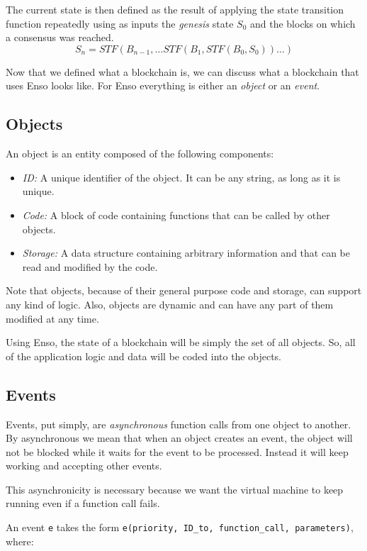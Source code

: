 \documentclass[conference]{IEEEtran}
\begin{document}
The current state is then defined as the result of applying the state transition function repeatedly using as inputs the \textit{genesis} state $ S_0 $ and the blocks on which a consensus was reached.
\[ S_n = STF(B_{n-1}, \ldots STF(B_1,STF(B_0,S_0)) \ldots) \]

Now that we defined what a blockchain is, we can discuss what a blockchain that uses Enso looks like. For Enso everything is either an \textit{object} or an \textit{event}.

\subsection{Objects}
An object is an entity composed of the following components:

\begin{itemize}
	\item \textit{ID:} A unique identifier of the object. It can be any string, as long as it is unique.
	\item \textit{Code:} A block of code containing functions that can be called by other objects.
	\item \textit{Storage:} A data structure containing arbitrary information and that can be read and modified by the code.
\end{itemize}

Note that objects, because of their general purpose code and storage, can support any kind of logic. Also, objects are dynamic and can have any part of them modified at any time.

Using Enso, the state of a blockchain will be simply the set of all objects. So, all of the application logic and data will be coded into the objects.

\subsection{Events}
Events, put simply, are \textit{asynchronous} function calls from one object to another. By asynchronous we mean that when an object creates an event, the object will not be blocked while it waits for the event to be processed. Instead it will keep working and accepting other events.

This asynchronicity is necessary because we want the virtual machine to keep running even if a function call fails.

An event \texttt{e} takes the form \texttt{e(priority, ID\_to, function\_call, parameters)}, where:
\end{document}
